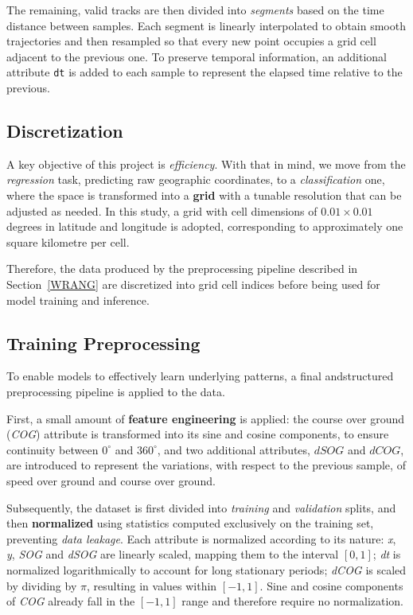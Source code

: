 \documentclass{article}
\begin{document}
The remaining, valid tracks are then divided into \textit{segments} based on the time distance between samples. Each segment is linearly interpolated to obtain smooth trajectories and then resampled so that every new point occupies a grid cell adjacent to the previous one. To preserve temporal information, an additional attribute \texttt{dt} is added to each sample to represent the elapsed time relative to the previous.

\subsection{Discretization}
A key objective of this project is \textit{efficiency}. With that in mind, we move from the \textit{regression} task, predicting raw geographic coordinates, to a \textit{classification} one, where the space is transformed into a \textbf{grid} with a tunable resolution that can be adjusted as needed. In this study, a grid with cell dimensions of $0.01 \times 0.01$ degrees in latitude and longitude is adopted, corresponding to approximately one square kilometre per cell.

Therefore, the data produced by the preprocessing pipeline described in Section~\ref{WRANG} are discretized into grid cell indices before being used for model training and inference.

\subsection{Training Preprocessing}\label{PREPROC}
To enable models to effectively learn underlying patterns, a final andstructured preprocessing pipeline is applied to the data.

First, a small amount of \textbf{feature engineering} is applied: the course over ground (\textit{COG}) attribute is transformed into its sine and cosine components, to ensure continuity between $0^\circ$ and $360^\circ$, and two additional attributes, $dSOG$ and $dCOG$, are introduced to represent the variations, with respect to the previous sample, of speed over ground and course over ground.

Subsequently, the dataset is first divided into \textit{training} and \textit{validation} splits, and then \textbf{normalized} using statistics computed exclusively on the training set, preventing \textit{data leakage}. Each attribute is normalized according to its nature: \textit{x}, \textit{y}, \textit{SOG} and \textit{dSOG} are linearly scaled, mapping them to the interval $[0,1]$; \textit{dt} is normalized logarithmically to account for long stationary periods; \textit{dCOG} is scaled by dividing by $\pi$, resulting in values within $[-1,1]$. Sine and cosine components of \textit{COG} already fall in the $[-1,1]$ range and therefore require no normalization.
\end{document}
